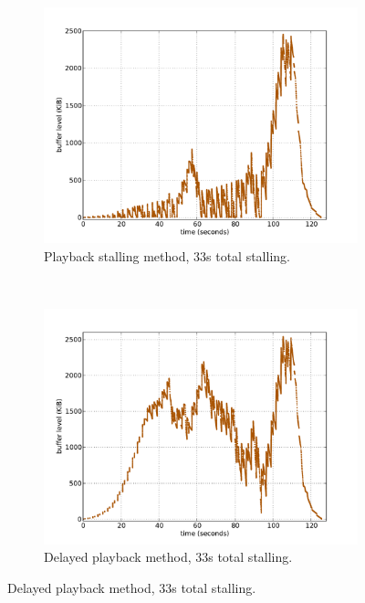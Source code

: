 \begin{figure}[htbp]
        \centering
        \begin{subfigure}[b]{0.50\textwidth}
                \centering
                \includegraphics[width=\textwidth]{images/bufferlevel-stall-new.pdf}
                \caption{Playback stalling method, 33s total stalling.}
                \label{c3:fig:bufferlevel-stall}
        \end{subfigure}%
        ~
        \begin{subfigure}[b]{0.50\textwidth}
                \centering
                \includegraphics[width=\textwidth]{images/bufferlevel-startdelay-new.pdf}
                \caption{Delayed playback method, 33s total stalling.}
                \label{c3:fig:bufferlevel-startdelay}
        \end{subfigure}


\end{figure}
